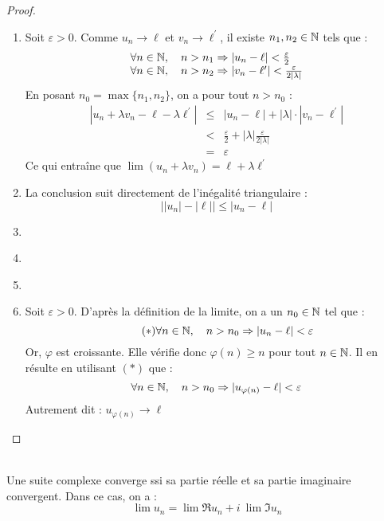     \begin{proof}
        \ \\
        \begin{enumerate}[label=(\roman*)]
            \item Soit \(\varepsilon>0\). Comme \(u_n\to\ell \) et \(v_n \to \ell^{\prime}\), il existe \(n_1, n_2 \in \mathbb{N}\) tels que :
            \[
                \begin{array}{l}
                    \forall n \in \mathbb{N},\quad n > n_1 \Rightarrow |u_n - \ell| < \frac{\varepsilon}{2}\\
                    \forall n \in \mathbb{N},\quad n > n_2 \Rightarrow |v_n - \ell^{\prime}| < \frac{\varepsilon}{2|\lambda|}\\
                \end{array}    
            \]
            En posant \(n_0 = \max{\{n_1, n_2\}}\), on a pour tout \(n>n_0\) :
            \[
                \begin{array}{lcl}
                    |u_n + \lambda v_n - \ell - \lambda \ell^{\prime}| &\le& |u_n  - \ell| + |\lambda|\cdot|v_n - \ell^{\prime}|\\
                     &<& \frac{\varepsilon}{2} + |\lambda|\frac{\varepsilon}{2|\lambda|}\\
                     &=& \varepsilon
                \end{array}
            \]
            Ce qui entraîne que \(\lim (u_n + \lambda v_n) = \ell + \lambda \ell^{\prime}\) 
            
            \item La conclusion suit directement de l'inégalité triangulaire : \[\Big| |u_n| - |\ell| \Big| \le |u_n - \ell|\]
            \item \ 
            \item \ 
            \item \ 
            \item Soit \(\varepsilon > 0\). D'après la définition de la limite, on a un  \(n_0\in\mathbb{N}\) tel que : 
            \begin{equation*}
                \tag*{\((\ast)\)}
                \forall n \in \mathbb{N}, \quad n > n_0 \Rightarrow |u_n - \ell| < \varepsilon 
            \end{equation*}
            Or, \(\varphi\) est croissante. Elle vérifie donc \(\varphi(n) \ge n\) pour tout \(n\in\mathbb{N}\). Il en résulte en utilisant \((\ast)\) que :
            \[
                \forall n \in \mathbb{N}, \quad n > n_0 \Rightarrow |u_{\varphi(n)} - \ell| < \varepsilon     
            \]
            Autrement dit : \(u_{\varphi(n)} \to\ell \)
        \end{enumerate}
    \end{proof}

    \begin{corollary}\ \\
        Une suite complexe converge ssi sa partie réelle et sa partie imaginaire convergent. Dans ce cas, on a :
        \[\lim u_n = \lim \Re{u_n} + i\ \lim\Im{u_n}\] 
    \end{corollary}